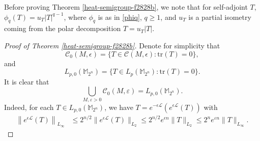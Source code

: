 \documentclass{amsbook}
\theoremstyle{definition}
\theoremstyle{remark}
\numberwithin{section}{chapter}
\numberwithin{equation}{chapter}
\newcommand{\1}{\mathbf{1}}
\begin{document}
Before proving Theorem \ref{heat-semigroup-f2828b}, we note that for self-adjoint $T$,  $\phi_{q}(T)= u_{T}|T|^{q-1}$, where $\phi_q$ is as in \eqref{phiq}, $q\geq 1$,  and $u_{T}$ is a partial isometry coming from the polar decomposition $T=u_{T}|T|$.
\begin{proof}[Proof of Theorem \ref{heat-semigroup-f2828b}]
Denote  for simplicity that
\[
\mathcal{C}_0(M,\epsilon)=\{T\in \mathcal{C}(M,\epsilon):\mathrm{tr}(T)=0\},
\]
 and
\[
L_{p,0}(\mathbb{M}_{2^{n}})=\{T\in L_{p}(\mathbb{M}_{2^{n}}):\mathrm{tr}(T)=0\}.
\]
It is clear that
\[
\bigcup_{M,\varepsilon>0}\mathcal{C}_{0}(M,\varepsilon)=L_{p,0}(\mathbb{M}_{2^{n}}).
\]
Indeed, for each $T\in L_{p,0}(\mathbb{M}_{2^{n}})$, we have $T=e^{-\epsilon\mathcal{L}}\left(e^{\epsilon\mathcal{L}}(T)\right)$ with
\[
\begin{split}
\left\|e^{\epsilon\mathcal{L}}(T)\right\|_{L_{\infty}}&\leq 2^{n/2}\|e^{\epsilon\mathcal{L}}(T)\|_{L_{2}}
\leq 2^{n/2}e^{\epsilon n}\|T\|_{L_{2}}\leq 2^{n}e^{\varepsilon n}\|T\|_{L_{\infty}}.
\end{split}
\]


\end{proof}
\end{document}
